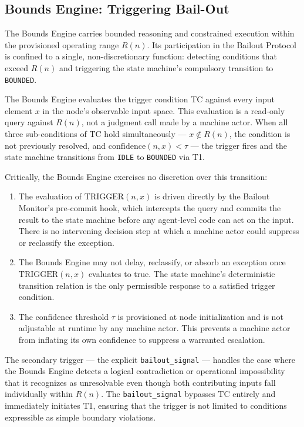 \subsection{Bounds Engine: Triggering Bail-Out}\label{sec:bailout-bounds}

The Bounds Engine carries bounded reasoning and constrained execution within the provisioned operating range $R(n)$. Its participation in the Bailout Protocol is confined to a single, non-discretionary function: detecting conditions that exceed $R(n)$ and triggering the state machine's compulsory transition to \texttt{BOUNDED}.

The Bounds Engine evaluates the trigger condition TC against every input element $x$ in the node's observable input space. This evaluation is a read-only query against $R(n)$, not a judgment call made by a machine actor. When all three sub-conditions of TC hold simultaneously --- $x \notin R(n)$, the condition is not previously resolved, and $\text{confidence}(n, x) < \tau$ --- the trigger fires and the state machine transitions from \texttt{IDLE} to \texttt{BOUNDED} via T1.

Critically, the Bounds Engine exercises no discretion over this transition:

\begin{enumerate}\itemsep=0pt
\item The evaluation of $\text{TRIGGER}(n, x)$ is driven directly by the Bailout Monitor's pre-commit hook, which intercepts the query and commits the result to the state machine before any agent-level code can act on the input. There is no intervening decision step at which a machine actor could suppress or reclassify the exception.

\item The Bounds Engine may not delay, reclassify, or absorb an exception once $\text{TRIGGER}(n, x)$ evaluates to true. The state machine's deterministic transition relation is the only permissible response to a satisfied trigger condition.

\item The confidence threshold $\tau$ is provisioned at node initialization and is not adjustable at runtime by any machine actor. This prevents a machine actor from inflating its own confidence to suppress a warranted escalation.
\end{enumerate}

The secondary trigger --- the explicit \texttt{bailout\_signal} --- handles the case where the Bounds Engine detects a logical contradiction or operational impossibility that it recognizes as unresolvable even though both contributing inputs fall individually within $R(n)$. The \texttt{bailout\_signal} bypasses TC entirely and immediately initiates T1, ensuring that the trigger is not limited to conditions expressible as simple boundary violations.

